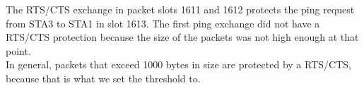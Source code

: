 The RTS/CTS exchange in packet slots 1611 and 1612 protects the ping request from STA3 to STA1 in slot 1613. The first ping exchange did not have a RTS/CTS protection because the size of the packets was not high enough at that point.\\
In general, packets that exceed 1000 bytes in size are protected by a RTS/CTS, because that is what we set the threshold to.
